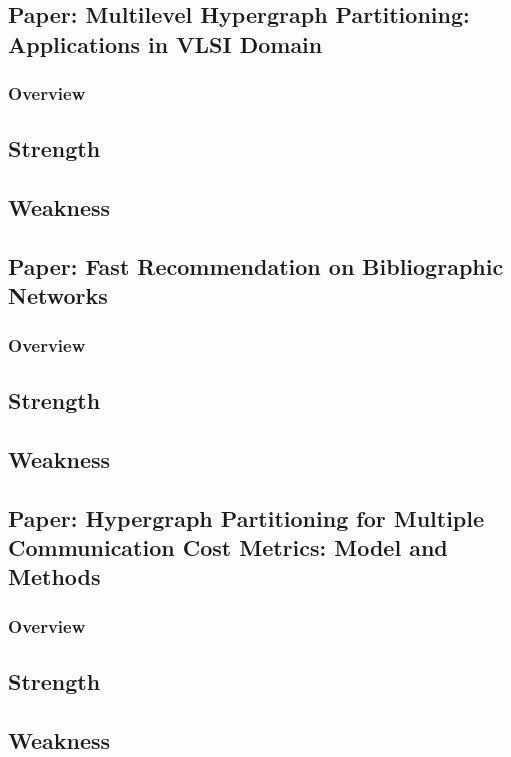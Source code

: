 \documentclass[conference, onecolumn]{IEEEtran}
\begin{document}
\newpage

\subsection{Paper: Multilevel Hypergraph Partitioning: Applications in VLSI Domain}

\subsubsection{Overview}

\subsection{Strength}

\subsection{Weakness}


\newpage

\subsection{Paper: Fast Recommendation on Bibliographic Networks}

\subsubsection{Overview}

\subsection{Strength}

\subsection{Weakness}


\newpage

\subsection{Paper: Hypergraph Partitioning for Multiple Communication Cost Metrics: Model and Methods}

\subsubsection{Overview}

\subsection{Strength}

\subsection{Weakness}
\end{document}
